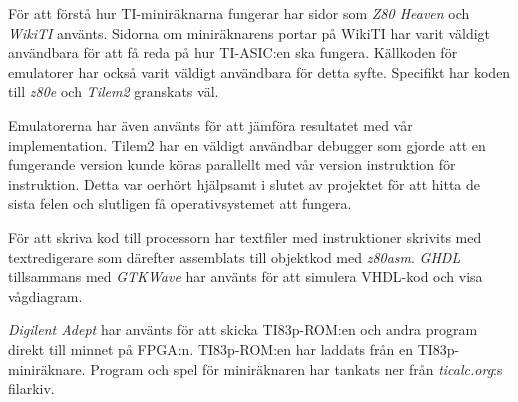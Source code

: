 \documentclass[main.tex]{subfiles}
\begin{document}
För att förstå hur TI-miniräknarna fungerar har sidor som {\it Z80
Heaven}\cite{z80heaven} och {\it WikiTI}\cite{brandonw} använts. Sidorna om
miniräknarens portar på WikiTI har varit väldigt användbara för att få reda på
hur TI-ASIC:en ska fungera. Källkoden för emulatorer har också varit väldigt
användbara för detta syfte. Specifikt har koden till {\it z80e}\cite{z80e} och
{\it Tilem2}\cite{tilem2} granskats väl.

Emulatorerna har även använts för att jämföra resultatet med vår
implementation. Tilem2 har en väldigt användbar debugger som gjorde att en
fungerande version kunde köras parallellt med vår version instruktion för
instruktion. Detta var oerhört hjälpsamt i slutet av projektet för att hitta de
sista felen och slutligen få operativsystemet att fungera.

För att skriva kod till processorn har textfiler med instruktioner skrivits med
textredigerare som därefter assemblats till objektkod med {\it
z80asm}\cite{z80asm}. {\it GHDL}\cite{ghdl} tillsammans med {\it
GTKWave}\cite{gtkwave} har använts för att simulera VHDL-kod och visa
vågdiagram.

{\it Digilent Adept} har använts för att skicka TI83p-ROM:en och andra program
direkt till minnet på FPGA:n. TI83p-ROM:en har laddats från en
TI83p-miniräknare. Program och spel för miniräknaren har tankats ner från
{\it ticalc.org}:s filarkiv\cite{ticalc}.

\clearpage
\end{document}
